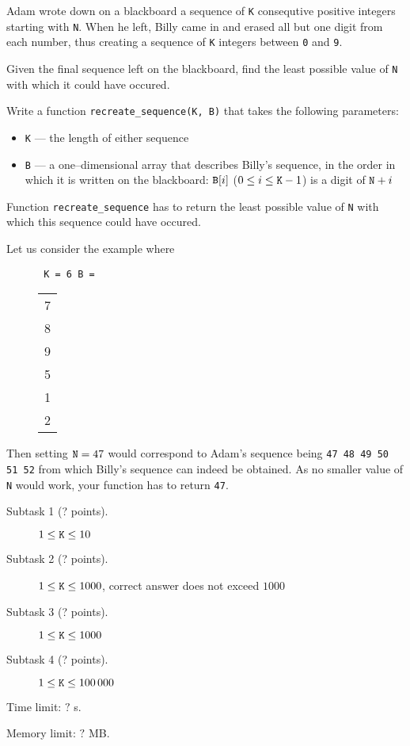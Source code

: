 \documentclass{boi2014}
\newcommand{\param}[1]{{\tt #1}}
\newcommand{\method}[1]{{\tt #1}}
\newcommand{\constant}[1]{{\tt #1}}
\begin{document}
    Adam wrote down on a blackboard a sequence of \param{K} consequtive
    positive integers starting with \param{N}. When he left, Billy came
    in and erased all but one digit from each number, thus creating a
    sequence of \param{K} integers between \constant{0} and \constant{9}.

    \Task

    Given the final sequence left on the blackboard, find the least
    possible value of \param{N} with which it could have occured.

    \Implementation

    Write a function \method{recreate\_sequence(K, B)} that takes
    the following parameters:
    \begin{itemize}
        \item \param{K} --- the length of either sequence
        \item \param{B} --- a one--dimensional array that describes
                            Billy's sequence, in the order in which
                            it is written on the blackboard: $\param{B}[i]$
                            ($0 \le i \le \param{K}-1$) is a digit
                            of $\param{N}+i$
    \end{itemize}

    Function \method{recreate\_sequence} has to return the least possible
    value of \param{N} with which this sequence could have occured.

    \Example

    Let us consider the example where
    \begin{figure}[H]
        \centering
        \constant{%
            \param{K} = 6
            \;
            \param{B} =%
            \begin{tabular}{c}
                7\\8\\9\\5\\1\\2
            \end{tabular}
        }
    \end{figure}

    Then setting $\param{N}=47$ would correspond to Adam's sequence
    being \constant{47 48 49 50 51 52} from which Billy's sequence
    can indeed be obtained. As no smaller value of \param{N}
    would work, your function has to return \constant{47}.

\Scoring

\begin{description}
    \item[Subtask 1 (? points).] $1 \le \param{K} \le 10$
    \item[Subtask 2 (? points).] $1 \le \param{K} \le 1000$, correct
        answer does not exceed $1000$
    \item[Subtask 3 (? points).] $1 \le \param{K} \le 1000$
    \item[Subtask 4 (? points).] $1 \le \param{K} \le 100\,000$
\end{description}

\Constraints

Time limit: $?$ s.

Memory limit: $?$ MB.
\end{document}
